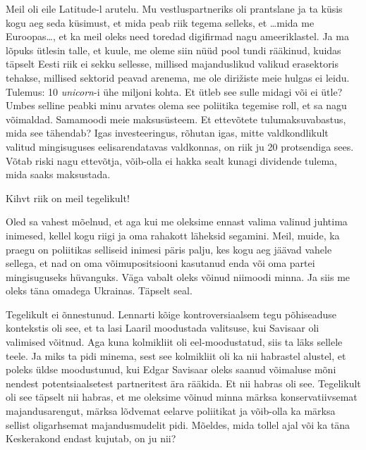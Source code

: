 Meil oli eile Latitude-l arutelu. Mu  vestluspartneriks oli prantslane ja ta küsis 
kogu aeg seda küsimust, et mida peab riik tegema selleks, et \ldots mida me 
Euroopas\ldots, et ka meil oleks need toredad digifirmad nagu ameeriklastel. Ja 
ma lõpuks ütlesin talle, et kuule, me oleme siin nüüd pool tundi rääkinud, 
kuidas täpselt Eesti riik ei sekku sellesse, millised majanduslikud valikud 
erasektoris tehakse, millised sektorid peavad arenema, me ole 
dirižiste meie hulgas ei leidu. Tulemus: 10 
\emph{unicorn}-i ühe miljoni kohta. Et ütleb see sulle midagi või ei ütle? 
Umbes selline peabki minu arvates olema see poliitika tegemise roll, et sa nagu 
võimaldad. Samamoodi meie maksusüsteem. Et ettevõtete tulumaksuvabastus, mida 
see tähendab? Igas investeeringus, rõhutan igas, mitte valdkondlikult valitud 
mingisuguses eelisarendatavas valdkonnas, on riik ju 20 protsendiga sees. Võtab 
riski nagu ettevõtja, võib-olla ei hakka sealt kunagi dividende tulema, mida 
saaks maksustada.

Kihvt riik on meil tegelikult!


Oled sa vahest mõelnud, et aga kui me oleksime ennast valima valinud juhtima 
inimesed, kellel kogu riigi ja oma rahakott läheksid segamini. Meil, muide, ka 
praegu on poliitikas selliseid inimesi päris palju, kes kogu aeg jäävad vahele 
sellega, et nad on oma võimupositsiooni kasutanud enda või oma partei 
mingisuguseks hüvanguks. Väga vabalt oleks võinud niimoodi minna. Ja siis me 
oleks täna omadega Ukrainas. Täpselt seal.


Tegelikult ei õnnestunud.  Lennarti  kõige kontroversiaalsem tegu 
põhiseaduse kontekstis oli see, et ta lasi Laaril moodustada valitsuse, kui 
Savisaar oli valimised võitnud. Aga kuna kolmikliit oli eel-moodustatud, siis ta läks sellele teele. Ja miks ta pidi 
minema, sest see kolmikliit oli ka nii habrastel alustel, et poleks üldse 
moodustunud, kui Edgar Savisaar oleks saanud 
võimaluse mõni nendest potentsiaalsetest partneritest ära rääkida. Et nii 
habras oli see. Tegelikult oli see täpselt nii habras, et me oleksime võinud 
minna märksa konservatiivsemat majandusarengut, märksa lõdvemat eelarve 
poliitikat ja võib-olla ka märksa sellist oligarhsemat majandusmudelit pidi. 
Mõeldes, mida tollel ajal või ka täna Keskerakond endast kujutab, on ju nii?


